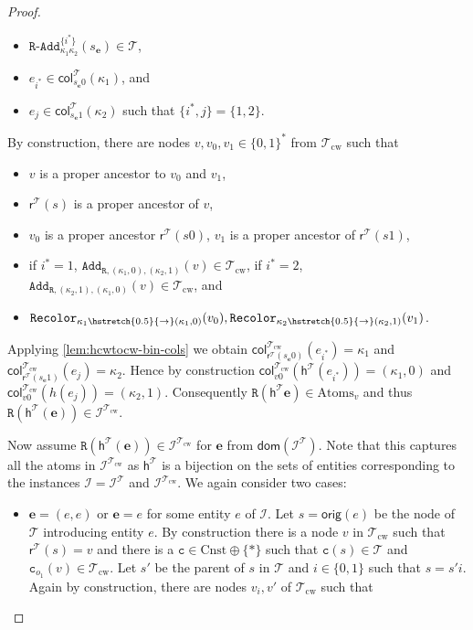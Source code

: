 \documentclass[10pt,a4paper]{amsart}
\theoremstyle{definition}
\numberwithin{equation}{section}
\theoremstyle{plain}
\theoremstyle{definition}
\theoremstyle{myexample}
\theoremstyle{plain}
\theoremstyle{definition}
\renewcommand{\vec}[1]{\boldsymbol{#1}}
\newcommand{\instance}{\mathcal{I}}
\newcommand{\inst}{\instance}
\newcommand{\adom}[1]{\fcn{dom}(#1)}
\newcommand{\origcol}{o}
\newcommand{\disun}{\oplus}
\newcommand{\radd}[4]{#4\pred{\texttt{-}Add}^{#3}_{#1#2}}
\newcommand{\fcn}[1]{\mathsf{#1}}
\newcommand{\col}{\fcn{col}}
\newcommand{\pred}[1]{\mathtt{#1}}
\newcommand{\const}[1]{\mathtt{#1}}
\newcommand{\ve}{\vec{e}}
\newcommand{\rpred}{\pred{R}}
\newcommand{\shortto}{\hstretch{0.5}{\to}}
\begin{document}
\begin{proof}
\begin{itemize}
		\begin{itemize}
			\item $\radd{\kappa_1}{\kappa_2}{\{ i^* \}}{\rpred}(s_{\ve})\in\mathcal{T}$,
			\item $e_{i^{*}} \in\col_{s_{\ve}0}^{\mathcal{T}}(\kappa_1)$, and
			\item $e_{j}\in\col_{s_{\ve}1}^{\mathcal{T}}(\kappa_2)$ such that $\{ i^*, j \} = \{ 1,2 \}$.
		\end{itemize}
		By construction, there are nodes $v, v_0, v_1\in\{ 0,1 \}^{\ast}$ from $\mathcal{T}_{\mathrm{cw}}$ such that
		\begin{itemize}
			\item $v$ is a proper ancestor to $v_0$ and $v_1$,
			\item $\fcn{r}^{\mathcal{T}}\!(s)$ is a proper ancestor of $v$,
			\item $v_0$ is a proper ancestor $\fcn{r}^{\mathcal{T}}\!(s0)$, $v_1$ is a proper ancestor of $\fcn{r}^{\mathcal{T}}\!(s1)$,
			\item if $i^* = 1$, $\pred{Add}_{\rpred, (\kappa_{1}, 0), (\kappa_{2}, 1)}(v)\in\mathcal{T}_{\mathrm{cw}}$, if $i^* = 2$, $\pred{Add}_{\rpred, (\kappa_{2}, 1), (\kappa_{1}, 0)}(v)\in\mathcal{T}_{\mathrm{cw}}$, and
			\item $\pred{Recolor}_{\kappa_1\shortto (\kappa_1, 0)}(v_0), \pred{Recolor}_{\kappa_2\shortto (\kappa_2, 1)}(v_1)$.
		\end{itemize}
		Applying \cref{lem:hcwtocw-bin-cols} we obtain $ \col_{\fcn{r}^{\mathcal{T}}\!(s_{\ve}0)}^{\mathcal{T}_{\mathrm{cw}}}(e_{i^{\ast}}) = \kappa_1$ and $\col_{\fcn{r}^{\mathcal{T}}\!(s_{\ve}1)}^{\mathcal{T}_{\mathrm{cw}}}(e_{j}) = \kappa_2$. Hence by construction $ \col_{v0}^{\mathcal{T}_{\mathrm{cw}}}(\fcn{h}^{\mathcal{T}}\!(e_{i^{\ast}})) = (\kappa_1, 0)$ and $\col_{v0}^{\mathcal{T}_{\mathrm{cw}}}(h(e_{j})) = (\kappa_2, 1)$. Consequently $\rpred(\fcn{h}^{\mathcal{T}}\!\ve)\in\mathrm{Atoms}_{v}$ and thus $\rpred(\fcn{h}^{\mathcal{T}}\!(\ve))\in\inst^{\mathcal{T}_{\mathrm{cw}}}$.
	\end{itemize}
	Now assume $\rpred(\fcn{h}^{\mathcal{T}}\!(\ve))\in\inst^{\mathcal{T}_{\mathrm{cw}}}$ for $\ve$ from $\adom{\inst^{\mathcal{T}}}$. Note that this captures all the atoms in $\inst^{\mathcal{T}_{\mathrm{cw}}}$ as $\fcn{h}^{\mathcal{T}}$ is a bijection on the sets of entities corresponding to the instances $\inst = \inst^{\mathcal{T}}$ and $\inst^{\mathcal{T}_{\mathrm{cw}}}$. We again consider two cases:
	\begin{itemize}
		\item $\ve = (e, e)$ or $\ve = e$ for some entity $e$ of $\inst$. Let $s = \fcn{orig}(e)$ be the node of $\mathcal{T}$ introducing entity $e$. By construction there is a node $v$ in $\mathcal{T}_{\mathrm{cw}}$ such that $\fcn{r}^{\mathcal{T}}\!(s) = v$ and there is a $\const{c}\in\mathrm{Cnst} {\disun} \{ \ast \}$ such that $\const{c}(s)\in\mathcal{T}$ and $\const{c}_{\origcol_1}(v)\in\mathcal{T}_{\mathrm{cw}}$. Let $s'$ be the parent of $s$ in $\mathcal{T}$ and $i\in\{ 0,1 \}$ such that $s = s'i$. Again by construction, there are nodes $v_{i}, v'$ of $\mathcal{T}_{\mathrm{cw}}$ such that

\end{itemize}
\end{proof}
\end{document}
